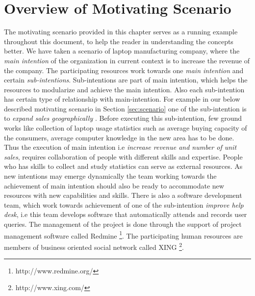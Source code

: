 \section{Overview of Motivating Scenario}
\label{sec:overview}
The motivating scenario provided in this chapter serves as a running example throughout this document, to help the reader in understanding the concepts better. We have taken a scenario of laptop manufacturing company, where the \textit{main intention} of the organization in current context is to increase the revenue of the company. The participating resources work towards one \textit{main intention} and certain \textit{sub-intentions}. Sub-intentions are part of main intention, which helps the resources to modularize and achieve the main intention. Also each sub-intention has certain type of relationship with main-intention. For example in our below described motivating scenario in Section \ref{sec:scenario} one of the sub-intention is to \textit{expand sales geographically} . Before executing this sub-intention, few ground works like collection of laptop usage statistics such as average buying capacity of the consumers, average computer knowledge in the new area has to be done. Thus the execution of main intention i.e \textit{increase revenue and number of unit sales}, requires collaboration of people with different skills and expertise. People who has skills to collect and study statistics can serve as external resources. As new intentions may emerge dynamically the team working towards the achievement of main intention should also be ready to accommodate new resources with new capabilities and skills. There is also a software development team, which work towards achievement of one of the sub-intention \textit{improve help desk}, i.e this team develops software that automatically attends and records user queries.  The management of the project is done through the support of project management software called Redmine \footnote{http://www.redmine.org/}. The participating human resources are members of business oriented social network called XING \footnote{http://www.xing.com/}.
 


